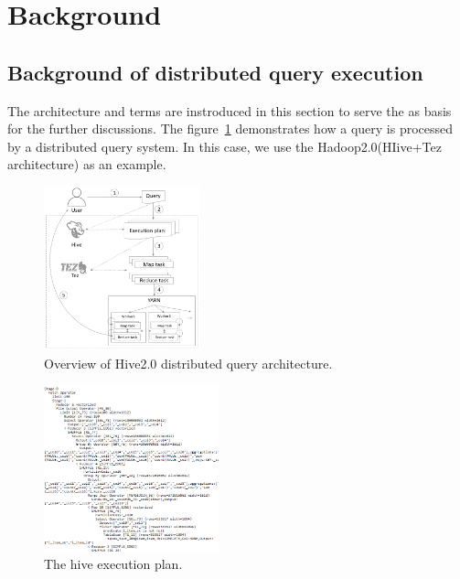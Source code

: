 \section{Background}
\subsection{Background of distributed query execution}
The architecture and terms are instroduced in this section to serve the as basis for the further discussions. 
The figure~\ref{fig:architecture} demonstrates how a query is processed by a distributed query system. In this case, we use the Hadoop2.0(HIive+Tez architecture) as an example.

\begin{figure}[t]
	\centering
	\includegraphics[width=0.40\textwidth]{figures/background/arc.png}
	\vspace{-3mm}
	\caption{Overview of Hive2.0 distributed query architecture.}
	\label{fig:architecture}
	\vspace{-3mm}
\end{figure}


\begin{figure}[t]
	\centering
	\includegraphics[width=0.45\textwidth]{figures/background/execution_plan.png}
	\vspace{-3mm}
	\caption{The hive execution plan.}
	\label{fig:exec_plan}
	\vspace{-3mm}
\end{figure}

